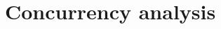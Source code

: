 \documentclass[cic,tc,english]{iiufrgs}
\numberwithin{algorithm}{chapter}
\begin{document}
    

    


            




        \section{Concurrency analysis}
        \label{subsec:phase1_concurrency}
\end{document}
